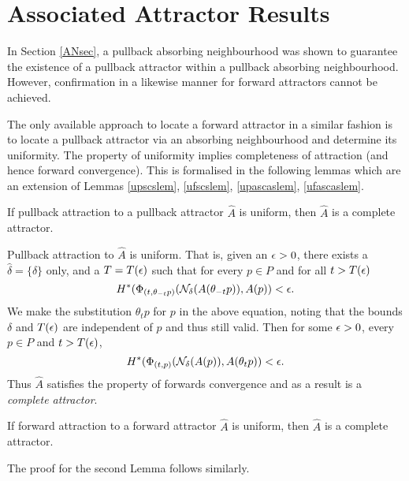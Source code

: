 
\section{Associated Attractor Results}

In Section \ref{ANsec}, a pullback absorbing neighbourhood was
shown to guarantee the existence of a pullback attractor within a
pullback absorbing neighbourhood. However, confirmation in a
likewise manner for forward attractors cannot be achieved.

The only available approach to locate a forward attractor in a similar fashion
is to locate a pullback attractor via an absorbing neighbourhood and determine
its uniformity. The property of uniformity implies completeness of attraction
(and hence forward convergence). This is formalised in the following lemmas
which are an extension of Lemmas \ref{upscslem}, \ref{ufscslem},
\ref{upascaslem}, \ref{ufascaslem}.

\begin{lemma}
\label{uattlem}
If pullback attraction to a pullback attractor $\hat{A}$ is uniform, then
$\hat{A}$ is a complete attractor.
\end{lemma}
\begin{prf}
Pullback attraction to $\hat{A}$ is uniform. That is, given an $\epsilon > 0$,
there exists a $\hat{\delta} = \{\delta\}$ only, and a $T=T(\epsilon)$ such that for
every $p \in P$ and for all $t > T(\epsilon)$
\[ H^*(\Phi_{(t,\theta_{-t}p)}(\mathcal{N}_{\delta}(A(\theta_{-t}p)),A(p))
                        < \epsilon. \]
We make the substitution $\theta_t p$ for $p$ in the above
equation, noting that the bounds $\delta$ and $T(\epsilon)$ are
independent of $p$ and thus still valid. Then for some $\epsilon > 0$,
every $p \in P$ and $t > T(\epsilon)$,
\[ H^*(\Phi_{(t,p)}(\mathcal{N}_{\delta}(A(p)),A(\theta_t p)) < \epsilon. \]
Thus $\hat{A}$ satisfies the property of forwards convergence and as a
result is a {\em complete attractor}.
\end{prf}

\begin{lemma}
If forward attraction to a forward attractor $\hat{A}$ is uniform, then
$\hat{A}$ is a complete attractor.
\end{lemma}
\begin{prf}
The proof for the second Lemma follows similarly.
\end{prf}

\endinput
